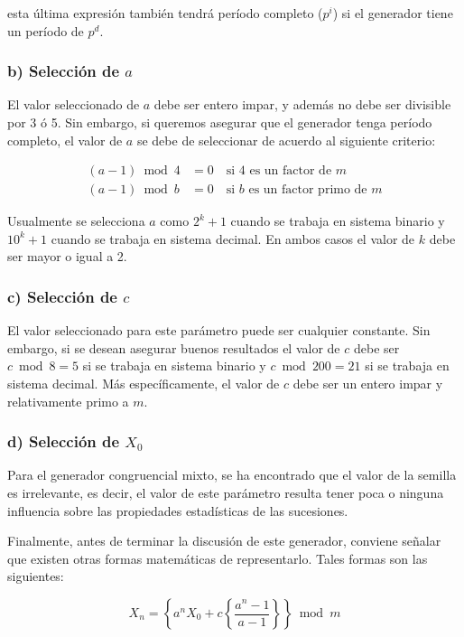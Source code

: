 \documentclass[11pt,letterpaper]{report}
\begin{document}
esta última expresión también tendrá período completo ($p^i$) si el
generador tiene un período de $p^d$.

\subsubsection*{b) Selección de $a$}

El valor seleccionado de $a$ debe ser entero impar, y además no debe ser
divisible por 3 ó 5. Sin embargo, si queremos asegurar que el generador
tenga período completo, el valor de $a$ se debe de seleccionar de
acuerdo al siguiente criterio:

\begin{align*}
(a-1) \bmod 4 &= 0 \quad \text{si } 4 \text{ es un factor de } m \\
(a-1) \bmod b &= 0 \quad \text{si } b \text{ es un factor primo de } m
\end{align*}

Usualmente se selecciona $a$ como $2^k+1$ cuando se trabaja en sistema
binario y $10^k+1$ cuando se trabaja en sistema decimal. En ambos casos
el valor de $k$ debe ser mayor o igual a 2.

\subsubsection*{c) Selección de $c$}

El valor seleccionado para este parámetro puede ser cualquier constante.
Sin embargo, si se desean asegurar buenos resultados el valor de $c$
debe ser $c \bmod 8 = 5$ si se trabaja en sistema binario y $c \bmod
200 = 21$ si se trabaja en sistema decimal. Más específicamente, el
valor de $c$ debe ser un entero impar y relativamente primo a $m$.

\subsubsection*{d) Selección de $X_0$}

Para el generador congruencial mixto, se ha encontrado que el valor de
la semilla es irrelevante, es decir, el valor de este parámetro resulta
tener poca o ninguna influencia sobre las propiedades estadísticas de
las sucesiones.

Finalmente, antes de terminar la discusión de este generador, conviene
señalar que existen otras formas matemáticas de representarlo. Tales
formas son las siguientes:

\begin{equation}
X_n = \left\{ a^n X_0 + c \left\{ \frac{a^n - 1}{a-1} \right\} \right\} \bmod m
\end{equation}
\end{document}
